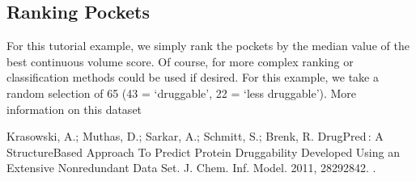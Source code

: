 \documentclass[letterpaper,10pt,english]{sphinxmanual}
\begin{document}
\begin{sphinxVerbatim}[commandchars=\\\{\}]
      
                          \PYG{p}{[}\PYG{p}{]}  
                          \PYG{p}{[}\PYG{p}{]}  
                          \PYG{p}{[}\PYG{p}{]}  
\end{sphinxVerbatim}


\subsection{Ranking Pockets}
\label{\detokenize{tutorial:ranking-pockets}}
For this tutorial example, we simply rank the pockets by the median value of the best continuous volume score. Of course,
for more complex ranking or classification methods could be used if desired. For this example, we take a random
selection of 65 (43 = ‘druggable’, 22 = ‘less druggable’). More information on this dataset

Krasowski, A.; Muthas, D.; Sarkar, A.; Schmitt, S.; Brenk, R. DrugPred : A Structure\sphinxhyphen{}Based Approach To Predict
Protein Druggability Developed Using an Extensive Nonredundant Data Set.
J. Chem. Inf. Model. 2011, 2829\textendash{}2842. .
\end{document}

